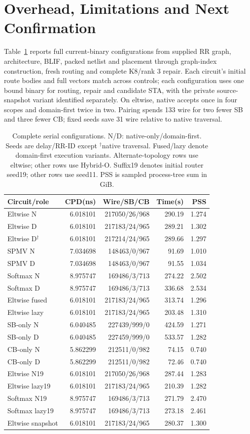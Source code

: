 \documentclass[conference,10pt]{IEEEtran}
\begin{document}
\section{Overhead, Limitations and Next Confirmation}
Table~\ref{tab:completecost} reports full current-binary configurations from supplied RR graph, architecture, BLIF, packed netlist and placement through graph-index construction, fresh routing and complete K8/rank 3 repair. Each circuit's initial route bodies and full vectors match across controls; each configuration uses one bound binary for routing, repair and candidate STA, with the private source-snapshot variant identified separately. On eltwise, native accepts once in four scopes and domain-first twice in two. Pairing spends 133 wire for two fewer SB and three fewer CB; fixed seeds save 31 wire relative to native traversal.
\begin{table}[t]
\centering\footnotesize\setlength{\tabcolsep}{3pt}
\caption{Complete serial configurations. N/D: native-only/domain-first. Seeds are delay/RR-ID except $^\dagger$native traversal. Fused/lazy denote domain-first execution variants. Alternate-topology rows use eltwise; other rows use Hybrid-O. Suffix19 denotes initial router seed19; other rows use seed11. PSS is sampled process-tree sum in GiB.}
\label{tab:completecost}
\begin{tabular}{lrrrr}\hline
Circuit/role & CPD(ns) & Wire/SB/CB & Time(s) & PSS\\\hline
Eltwise N&6.018101&217050/26/968&290.19&1.274\\
Eltwise D&6.018101&217183/24/965&289.21&1.302\\
Eltwise D$^\dagger$&6.018101&217214/24/965&289.66&1.297\\
SPMV N&7.034698&148463/0/967&91.69&1.010\\
SPMV D&7.034698&148463/0/967&91.55&1.034\\
Softmax N&8.975747&169486/3/713&274.22&2.502\\
Softmax D&8.975747&169486/3/713&336.68&2.534\\
Eltwise fused&6.018101&217183/24/965&313.74&1.296\\
Eltwise lazy&6.018101&217183/24/965&203.48&1.310\\
SB-only N&6.040485&227439/999/0&424.59&1.271\\
SB-only D&6.040485&227459/999/0&533.57&1.282\\
CB-only N&5.862299&212511/0/982&74.15&0.740\\
CB-only D&5.862299&212511/0/982&72.46&0.740\\
Eltwise N19&6.018101&217050/26/968&287.44&1.283\\
Eltwise lazy19&6.018101&217183/24/965&210.39&1.282\\
Softmax N19&8.975747&169486/3/713&271.79&2.470\\
Softmax lazy19&8.975747&169486/3/713&273.18&2.461\\
Eltwise snapshot&6.018101&217183/24/965&280.37&1.300\\\hline
\end{tabular}
\end{table}
\end{document}
